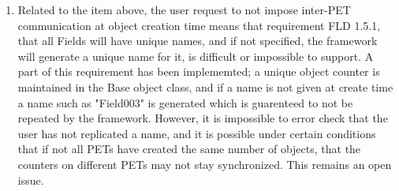 \begin{enumerate}
\item Related to the item above, the user request to not impose
inter-PET communication at object creation time means that requirement
FLD 1.5.1, that all Fields will have unique names, and if not specified, 
the framework will generate a unique name for it, is difficult or
impossible to support.  A part of this requirement has been implememted;
a unique object counter is maintained in the Base object class, and if
a name is not given at create time a name such as "Field003" is generated
which is guarenteed to not be repeated by the framework.   However, it
is impossible to error check that the user has not replicated a name,
and it is possible under certain conditions that if not all PETs have
created the same number of objects, that the counters on different PETs
may not stay synchronized.   This remains an open issue.

\end{enumerate}
